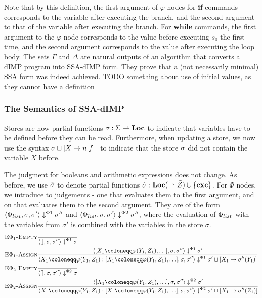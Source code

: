 Note that by this definition, the first argument of $\varphi$ nodes for \textbf{if} commands
corresponds to the variable after executing the \btrue{} branch, and the second argument to that
of the variable after executing the \bfalse{} branch.
For \textbf{while} commands, the first argument to the $\varphi$ node corresponds to the value
before executing $s_0$ the first time, and the second argument corresponds to the value 
after executing the loop body.
The sets $\Gamma$ and $\Delta$ are natural outputs of an algorithm that converts a 
dIMP program into SSA-dIMP form.
They prove that a (not necessarily minimal) SSA form was indeed achieved.
TODO something about use of initial values, as they cannot have a definition

\subsubsection*{The Semantics of SSA-dIMP}
Stores are now partial functions $\sigma : \Sigma \rightharpoonup \textbf{Loc}$ to indicate that
variables have to be defined before they can be read.
Furthermore, when updating a store, we now use the syntax 
$\store \dunion [X \mapsto \flagged{}]$ to indicate that the store $\sigma$ did not
contain the variable $X$ before.

The judgment for booleans and arithmetic expressions does not change.
As before, we use $\hat{\sigma}{}$ to denote partial functions
$\hat{\sigma}{}: \textbf{Loc} (\rightharpoonup \tilde{Z}) \cup \{\textbf{exc}\}$.
For $\Phi$ nodes, we introduce to judgements - one that evaluates them to the first argument,
and on that evaluates them to the second argument.
They are of the form $\langle \Phi_{list}, \sigma, \sigma' \rangle \downarrow^{\Phi1} \sigma''$ 
and $\langle \Phi_{list}, \sigma, \sigma' \rangle \downarrow^{\Phi2} \sigma''$,
where the evaluation of $\Phi_{list}$ with the variables from $\sigma'$
is combined with the variables in the store $\sigma$.
\begin{align*}
    &\bsrule{E$\Phi_1$-Empty}{}{\bigsteppl{[]}{\store}{\store''}{\store}}\\
    &\bsrule{E$\Phi_1$-Assign}
    {\bigsteppl{\defaultphilist}{\store}{\store''}{\store'}}
    {\bigsteppl{\phistore{X_1}{Y_1}{Z_1} : \defaultphilist}{\store}{\store''}{\storeassign{\store'}{X_1 \mapsto \store''(Y_1)}}}\\
    &\bsrule{E$\Phi_2$-Empty}{}{\bigsteppr{[]}{\store}{\store''}{\store}}\\
    &\bsrule{E$\Phi_2$-Assign}
    {\bigsteppr{\defaultphilist}{\store}{\store''}{\store'}}
    {\bigsteppr{\phistore{X_1}{Y_1}{Z_1} : \defaultphilist}{\store}{\store''}{\storeassign{\store'}{X_1 \mapsto \store''(Z_1)}}}\\
\end{align*}

